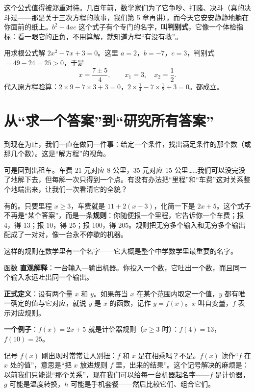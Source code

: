 这个公式值得被郑重对待。几百年前，数学家们为了它争吵、打赌、决斗（真的决斗过——那是关于三次方程的故事，我们第 5 章再讲），而今天它安安静静地躺在你面前的纸上。$b^2 - 4ac$ 这个式子有个专门的名字，叫\textbf{判别式}，它像一个体检指标：看一眼它的正负，不用算解，就知道方程“有没有救”。

\begin{li}
用求根公式解 $2x^2 - 7x + 3 = 0$。这里 $a = 2$，$b = -7$，$c = 3$，判别式 $= 49 - 24 = 25 > 0$，于是
\[
x = \frac{7 \pm 5}{4},\qquad x_1 = 3,\quad x_2 = \frac{1}{2}.
\]
代入原方程验算：$2 \times 9 - 7 \times 3 + 3 = 0$，$2 \times \frac{1}{4} - 7 \times \frac{1}{2} + 3 = 0$。都成立。
\end{li}

\section{从“求一个答案”到“研究所有答案”}

到现在为止，我们一直在做同一件事：给定一个条件，找出满足条件的那个数（或那几个数）。这是“解方程”的视角。

可是回到出租车。车费 21 元对应 8 公里，35 元对应 15 公里……我们可以没完没了地解下去，但每解一次只得到一个点。有没有办法把“里程”和“车费”这对关系整个地端出来，让我们一次看清它的全貌？

有的。只要里程 $x \geq 3$，车费就是 $11 + 2(x - 3)$，化简一下是 $2x + 5$。这个式子不再是“某个答案”，而是一条\textbf{规则}：你随便报一个里程，它告诉你一个车费；报 4，得 13；报 10，得 25；报 100，得 205。规则把无穷多个输入和无穷多个输出配成了一对对，像一台永不停歇的机器。

这样的规则在数学里有一个名字——它大概是整个中学数学里最重要的名字。

\begin{shuyu}{函数}
\textbf{直观解释}：一台输入—输出机器。你投入一个数，它吐出一个数，而且同一个输入永远吐出同一个输出。

\textbf{正式定义}：设有两个量 $x$ 和 $y$。如果每当 $x$ 在某个范围内取定一个值，$y$ 都有唯一确定的值与它对应，就说 $y$ 是 $x$ 的函数，记作 $y = f(x)$。$x$ 叫自变量，$f$ 表示对应规则。

\textbf{一个例子}：$f(x) = 2x + 5$ 就是计价器规则（$x \geq 3$ 时）：$f(4) = 13$，$f(10) = 25$。
\end{shuyu}

记号 $f(x)$ 刚出现时常常让人别扭：$f$ 和 $x$ 是在相乘吗？不是。$f(x)$ 读作“$f$ 在 $x$ 处的值”，意思是“把 $x$ 放进规则 $f$ 里，出来的结果”。这个记号解决的麻烦是：以前我们只能说“那个关系”，现在我们可以给每一台机器起名字——$f$ 是计价器，$g$ 可能是温度转换，$h$ 可能是手机套餐——然后比较它们、组合它们。

